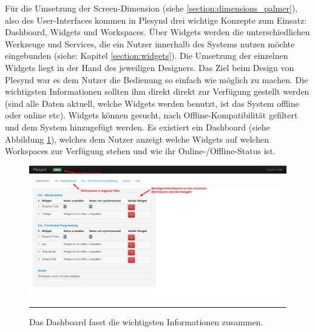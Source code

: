 Für die Umsetzung der Screen-Dimension (siehe \ref{section:dimensions_palmer}), also des User-Interfaces kommen in Plesynd drei wichtige Konzepte zum Einsatz: Dashboard, Widgets und Workspaces. Über Widgets werden die unterschiedlichen Werkzeuge und Services, die ein Nutzer innerhalb des Systems nutzen möchte eingebunden (siehe: Kapitel \ref{section:widgets}). Die Umsetzung der einzelnen Widgets liegt in der Hand des jeweiligen Designers. Das Ziel beim Design von Plesynd war es dem Nutzer die Bedienung so einfach wie möglich zu machen. Die wichtigsten Informationen sollten ihm direkt direkt zur Verfügung gestellt werden (sind alle Daten aktuell, welche Widgets werden benutzt, ist das System offline oder online etc). Widgets können gesucht, nach Offline-Kompatibilität gefiltert und dem System hinzugefügt werden. Es existiert ein Dashboard (siehe Abbildung \ref{fig:plesynd_dashboard}), welches dem Nutzer anzeigt welche Widgets auf welchen Workspaces zur Verfügung stehen und wie ihr Online-/Offline-Status ist.
\begin{figure}
  \centering
  \includegraphics[width=\textwidth,height=\textheight,keepaspectratio]{./Figures/plesynd_dashboard.png}
    \rule{35em}{0.5pt}
  \caption[Plesynd User-Interface: Dashboard]{Das Dashboard fasst die wichtigsten Informationen zusammen.}
  \label{fig:plesynd_dashboard}
\end{figure}

